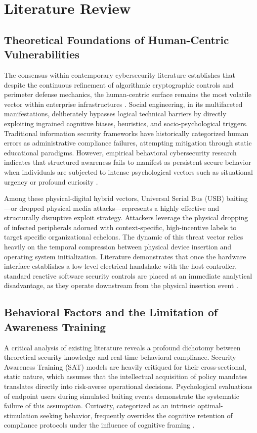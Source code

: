 \documentclass{ieeeaccess}
\begin{document}
 \section{Literature Review}
\label{sec:literature_review}
\FloatBarrier

\subsection{Theoretical Foundations of Human-Centric Vulnerabilities}
The consensus within contemporary cybersecurity literature establishes that despite the continuous refinement of algorithmic cryptographic controls and perimeter defense mechanics, the human-centric surface remains the most volatile vector within enterprise infrastructures \cite{ref6}. Social engineering, in its multifaceted manifestations, deliberately bypasses logical technical barriers by directly exploiting ingrained cognitive biases, heuristics, and socio-psychological triggers. Traditional information security frameworks have historically categorized human errors as administrative compliance failures, attempting mitigation through static educational paradigms. However, empirical behavioral cybersecurity research indicates that structured awareness fails to manifest as persistent secure behavior when individuals are subjected to intense psychological vectors such as situational urgency or profound curiosity \cite{ref7}.

Among these physical-digital hybrid vectors, Universal Serial Bus (USB) baiting—or dropped physical media attacks—represents a highly effective and structurally disruptive exploit strategy. Attackers leverage the physical dropping of infected peripherals adorned with context-specific, high-incentive labels to target specific organizational echelons. The dynamic of this threat vector relies heavily on the temporal compression between physical device insertion and operating system initialization. Literature demonstrates that once the hardware interface establishes a low-level electrical handshake with the host controller, standard reactive software security controls are placed at an immediate analytical disadvantage, as they operate downstream from the physical insertion event \cite{ref8}.

\subsection{Behavioral Factors and the Limitation of Awareness Training}
A critical analysis of existing literature reveals a profound dichotomy between theoretical security knowledge and real-time behavioral compliance. Security Awareness Training (SAT) models are heavily critiqued for their cross-sectional, static nature, which assumes that the intellectual acquisition of policy mandates translates directly into risk-averse operational decisions. Psychological evaluations of endpoint users during simulated baiting events demonstrate the systematic failure of this assumption. Curiosity, categorized as an intrinsic optimal-stimulation seeking behavior, frequently overrides the cognitive retention of compliance protocols under the influence of cognitive framing \cite{ref9} \cite{ref10}.
\end{document}
